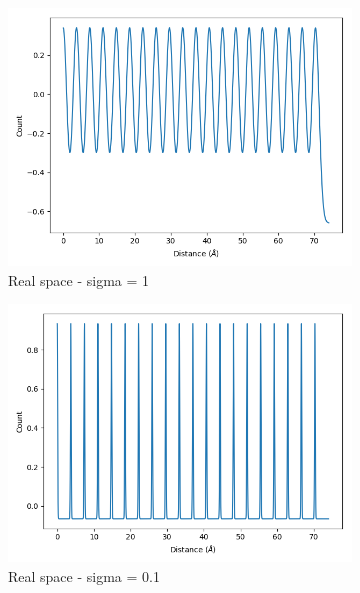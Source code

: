 \documentclass{article}
\begin{document}
\begin{figure}[h]
        \begin{subfigure}{0.33\textwidth}
                \centering
                \includegraphics[width=\textwidth]{real_gauss_1d_highsig.png}
                \caption{Real space - sigma = 1}\label{fig:real_gauss_1d_highsig}
        \end{subfigure}
        \begin{subfigure}{0.33\textwidth}
                \centering
                \includegraphics[width=\textwidth]{real_gauss_1d_medsig.png}
                \caption{Real space - sigma = 0.1}\label{fig:real_gauss_1d_medsig}
        \end{subfigure}
	\begin{subfigure}{0.33\textwidth}

\end{subfigure}
\end{figure}
\end{document}
